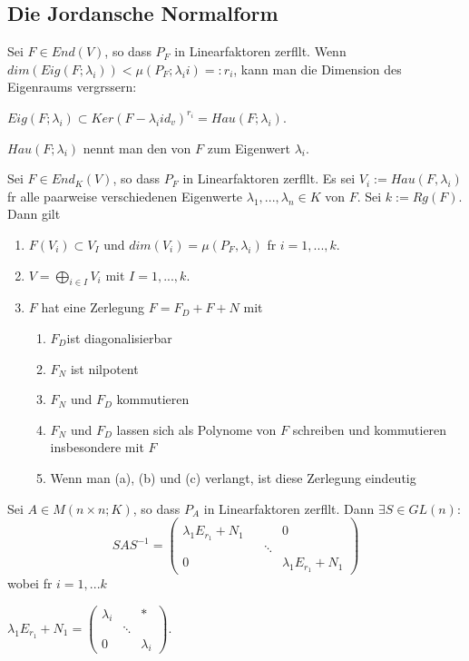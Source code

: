 \documentclass[11pt, a4paper]{article}
\begin{document}
\subsection{Die Jordansche Normalform}
\begin{definition}
Sei $F \in End(V)$, so dass $P_F$ in Linearfaktoren zerf\aee llt. Wenn $dim(Eig(F; \lambda_i)) < \mu (P_F; \lambda_ii) =: r_i$, kann man die Dimension des Eigenraums vergr\oee ssern: 
\\ \centerline{$Eig(F; \lambda_i) \subset Ker(F - \lambda_i id_v)^{r_i} = Hau(F; \lambda_i)$. }
$Hau(F; \lambda_i)$ nennt man den  von $F$ zum Eigenwert $\lambda_i$.
\end{definition}
\begin{theorem} 
Sei $F \in End_K(V)$, so dass $P_F$ in Linearfaktoren zerf\aee llt. Es sei $V_i := Hau(F, \lambda_i)$ f\uee r alle paarweise verschiedenen Eigenwerte $\lambda_1, ... , \lambda_n \in K$ von $F$. Sei $k := Rg(F)$. Dann gilt
\begin{enumerate}
\item $F(V_i) \subset V_I$ und $dim(V_i) = \mu (P_F, \lambda_i)$ f\uee r $i = 1, ..., k$. 
\item $V =\bigoplus\limits_{i \in I} V_i$ mit $I=1, ..., k$.
\item $F$ hat eine Zerlegung $F = F_D + F+N$ mit
\begin{enumerate}
\item $F_D $ist diagonalisierbar
\item$ F_N$ ist nilpotent
\item $F_N$ und $F_D$ kommutieren
\item $F_N$ und $F_D$ lassen sich als Polynome von $F$ schreiben und kommutieren insbesondere mit $F$
\item Wenn man (a), (b) und (c) verlangt, ist diese Zerlegung eindeutig
\end{enumerate}
\end{enumerate}
\end{theorem}

\begin{corollary}
Sei $A \in M(n \times n; K)$, so dass $P_A$ in Linearfaktoren zerf\aee llt. Dann $\exists S \in GL(n)$: 
$$
S A S^{-1}=\left(\begin{array}{cccc}{} & {} & {} & {} 
\\ {\lambda_{1} E_{r_{1}}+N_{1}} & {} & {} & {0} 
\\ {} & {} & {\ddots} & {} 
\\ {0} & {} & {} & {\lambda_{1} E_{r_{1}}+N_{1}} 
\end{array}\right)
$$
wobei f\uee r $i = 1, ... k$
\\ \centerline{$
\lambda_{1} E_{r_{1}}+N_{1} = 
\left(\begin{array}{ccc}
{\lambda_{i}} & {} & {*} 
\\ {} & {\ddots} & {} 
\\ {0} & {} & {\lambda_{i}}\end{array}\right) $.}
\end{corollary}
\end{document}
